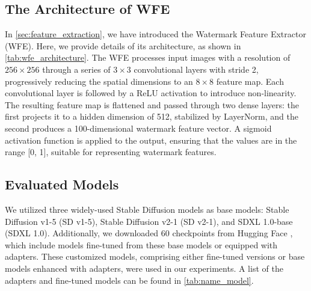 \subsection{The Architecture of WFE}
In \cref{sec:feature_extraction}, we have introduced the Watermark Feature Extractor (WFE). Here, we provide details of its architecture, as shown in \cref{tab:wfe_architecture}. The WFE processes input images with a resolution of $256 \times 256$ through a series of $3 \times 3$ convolutional layers with stride 2, progressively reducing the spatial dimensions to an $8 \times 8$ feature map. Each convolutional layer is followed by a ReLU activation to introduce non-linearity. The resulting feature map is flattened and passed through two dense layers: the first projects it to a hidden dimension of 512, stabilized by LayerNorm, and the second produces a 100-dimensional watermark feature vector. A sigmoid activation function is applied to the output, ensuring that the values are in the range [0, 1], suitable for representing watermark features.




\subsection{Evaluated Models}
We utilized three widely-used Stable Diffusion models as base models: Stable Diffusion v1-5 (SD v1-5), Stable Diffusion v2-1 (SD v2-1), and SDXL 1.0-base (SDXL 1.0). Additionally, we downloaded 60 checkpoints from Hugging Face \cite{huggingface}, which include models fine-tuned from these base models or equipped with adapters. These customized models, comprising either fine-tuned versions or base models enhanced with adapters, were used in our experiments. A list of the adapters and fine-tuned models can be found in \cref{tab:name_model}.

